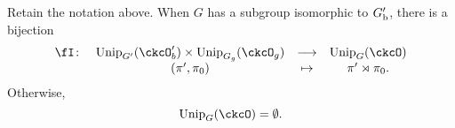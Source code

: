 \documentclass[counting_main.tex]{subfiles}
\begin{document}

\begin{thm}\label{reduction}
  Retain the notation above. When $G$ has a subgroup isomorphic to $G'_{\mathrm b}$, there
  is a bijection
  \begin{equation}\label{eq:IND}
    \begin{array}{rccc}
      \fI\colon &   \Unip_{G'}(\ckcO'_{b})\times \Unip_{G_{g}}(\ckcO_{g})&         \longrightarrow &\Unip_{G}(\ckcO) \\
                &   (\pi',\pi_{0}) & \mapsto & \pi'\rtimes \pi_{0}.
    \end{array}
  \end{equation}
  Otherwise,
  \[
    \Unip_{G}(\ckcO)=\emptyset.
  \]
\end{thm}
\end{document}
